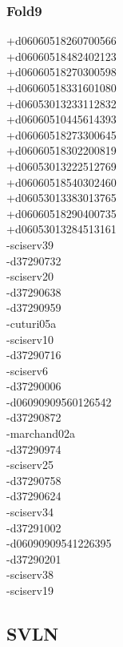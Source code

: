 \begin{multicols}{4}
\subsubsection*{Fold9}
+d06060518260700566\\
+d06060518482402123\\
+d06060518270300598\\
+d06060518331601080\\
+d06053013233112832\\
+d06060510445614393\\
+d06060518273300645\\
+d06060518302200819\\
+d06053013222512769\\
+d06060518540302460\\
+d06053013383013765\\
+d06060518290400735\\
+d06053013284513161\\
-sciserv39\\
-d37290732\\
-sciserv20\\
-d37290638\\
-d37290959\\
-cuturi05a\\
-sciserv10\\
-d37290716\\
-sciserv6\\
-d37290006\\
-d06090909560126542\\
-d37290872\\
-marchand02a\\
-d37290974\\
-sciserv25\\
-d37290758\\
-d37290624\\
-sciserv34\\
-d37291002\\
-d06090909541226395\\
-d37290201\\
-sciserv38\\
-sciserv19\\
\subsection*{SVLN}

\end{multicols}
